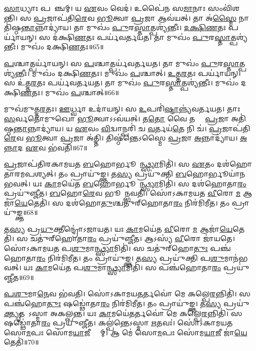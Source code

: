 \ul{𑌸𑌾}𑌧𑍍𑌯𑌾𑌃 𑌪𑌰𑌾᳚𑌞𑍍𑌚𑌮𑍍।
𑌯 \ul{𑌏}𑌵𑌂 𑌵𑍇𑌦॑।
𑌉𑌪𑍈॑𑌨 𑌸\ul{𑌮𑌾}𑌨𑌾𑌃 𑌸𑌂𑌵𑌿॑𑌶𑌨𑍍𑌤𑌿।
𑌸 \ul{𑌪𑍍𑌰}𑌜𑌾𑌪॑𑌤𑌿\ul{𑌰𑍇}𑌵 \ul{𑌭𑍂}𑌤𑍍𑌵𑌾 \ul{𑌪𑍍𑌰}𑌜𑌾 𑌆𑌵॑𑌯𑌤𑍍।
𑌤𑌾 𑌅॑\ul{𑌸𑍍𑌮𑍈} 𑌨𑌾𑌤𑌿॑𑌷𑍍𑌠\ul{𑌨𑍍𑌤𑌾}𑌨𑍍𑌨𑌾𑌦𑍍𑌯𑌾॑𑌯।
𑌤𑌾 𑌮𑍁𑌖𑌂॑ \ul{𑌪𑍁}𑌰\ul{𑌸𑍍𑌤𑌾}𑌤𑍍𑌪𑌶𑍍𑌯॑𑌨𑍍𑌤𑍀𑌃।
\ul{𑌦}\ul{𑌕𑍍𑌷𑌿}\ul{𑌣}𑌤𑌃 𑌪𑌰𑍍𑌯𑌾॑𑌯𑌨𑍍।
𑌸 𑌦॑𑌕𑍍𑌷𑌿\ul{𑌣}𑌤𑌃 𑌪𑌰𑍍𑌯॑𑌵𑌰𑍍𑌤𑌯𑌤।
𑌤𑌾 𑌮𑍁𑌖𑌂॑ \ul{𑌪𑍁}𑌰\ul{𑌸𑍍𑌤𑌾}𑌤𑍍𑌪𑌶𑍍𑌯॑𑌨𑍍𑌤𑍀𑌃।
𑌮𑍁𑌖𑌂॑ 𑌦𑌕𑍍𑌷𑌿\ul{𑌣}𑌤𑌃॥65॥

\ul{𑌪}𑌶𑍍𑌚𑌾𑌤𑍍𑌪𑌰𑍍𑌯𑌾॑𑌯𑌨𑍍।
𑌸 \ul{𑌪}𑌶𑍍𑌚𑌾𑌤𑍍𑌪𑌰𑍍𑌯॑𑌵𑌰𑍍𑌤𑌯𑌤।
𑌤𑌾 𑌮𑍁𑌖𑌂॑ \ul{𑌪𑍁}𑌰\ul{𑌸𑍍𑌤𑌾}𑌤𑍍𑌪𑌶𑍍𑌯॑𑌨𑍍𑌤𑍀𑌃।
𑌮𑍁𑌖𑌂॑ 𑌦𑌕𑍍𑌷𑌿\ul{𑌣}𑌤𑌃।
𑌮𑍁𑌖𑌂॑ \ul{𑌪}𑌶𑍍𑌚𑌾𑌤𑍍।
\ul{𑌉}\ul{𑌤𑍍𑌤}\ul{𑌰}𑌤𑌃 𑌪𑌰𑍍𑌯𑌾॑𑌯𑌨𑍍।
𑌸 𑌉॑𑌤𑍍𑌤\ul{𑌰}𑌤𑌃 𑌪𑌰𑍍𑌯॑𑌵𑌰𑍍𑌤𑌯𑌤।
𑌤𑌾 𑌮𑍁𑌖𑌂॑ \ul{𑌪𑍁}𑌰\ul{𑌸𑍍𑌤𑌾}𑌤𑍍𑌪𑌶𑍍𑌯॑𑌨𑍍𑌤𑍀𑌃।
𑌮𑍁𑌖𑌂॑ 𑌦𑌕𑍍𑌷𑌿\ul{𑌣}𑌤𑌃।
𑌮𑍁𑌖𑌂॑ \ul{𑌪}𑌶𑍍𑌚𑌾𑌤𑍍॥66॥

𑌮𑍁𑌖॑𑌮𑍁𑌤𑍍𑌤\ul{𑌰}𑌤𑌃।
\ul{𑌊}𑌰𑍍𑌧𑍍𑌵𑌾 𑌉𑌦𑌾॑𑌯𑌨𑍍।
𑌸 \ul{𑌉}𑌪𑌰𑌿॑\ul{𑌷𑍍𑌟𑌾}𑌨𑍍𑌨𑍍𑌯॑𑌵𑌰𑍍𑌤𑌯𑌤।
𑌤𑌾𑌃 \ul{𑌸}𑌰𑍍𑌵𑌤𑍋॑𑌮𑍁𑌖𑍋 \ul{𑌭𑍂}𑌤𑍍𑌵𑌾\-𑌽𑌽𑌵॑𑌯𑌤𑍍।
𑌤\ul{𑌤𑍋} 𑌵𑍈 𑌤𑌸𑍍𑌮𑍈᳚ \ul{𑌪𑍍𑌰}𑌜𑌾 𑌅𑌤𑌿॑𑌷𑍍𑌠\ul{𑌨𑍍𑌤𑌾}𑌨𑍍𑌨𑌾𑌦𑍍𑌯𑌾॑𑌯।
𑌯 \ul{𑌏}𑌵𑌂 \ul{𑌵𑌿}𑌦𑍍𑌵𑌾𑌨𑍍𑌪𑌰𑌿॑ 𑌚 \ul{𑌵}𑌰𑍍𑌤𑌯॑\ul{𑌤𑍇} 𑌨𑌿 𑌚॑।
\ul{𑌪𑍍𑌰}𑌜𑌾𑌪॑𑌤𑌿\ul{𑌰𑍇}𑌵 \ul{𑌭𑍂}𑌤𑍍𑌵𑌾 \ul{𑌪𑍍𑌰}𑌜𑌾 𑌅॑𑌤𑍍𑌤𑌿।
𑌤𑌿𑌷𑍍𑌠॑𑌨𑍍𑌤𑍇\-𑌽𑌸𑍍𑌮𑍈 \ul{𑌪𑍍𑌰}𑌜𑌾 \ul{𑌅}𑌨𑍍𑌨𑌾𑌦𑍍𑌯𑌾॑𑌯।
\ul{𑌅}\ul{𑌨𑍍𑌨𑌾}𑌦 \ul{𑌏}𑌵 𑌭॑𑌵𑌤𑌿॥67॥\anuvakamend[\ul{𑌆}\ul{𑌸𑍀}𑌦𑍍𑌵𑍇𑌦॑ 𑌚𑌨𑍍𑌦𑍍𑌰\ul{𑌮}𑌸𑍍𑌤𑍍𑌵𑌂 𑌯 \ul{𑌏}𑌵𑌂 𑌵𑍇𑌦𑍇᳚𑌨𑍍𑌦𑍍𑌰𑌿\ul{𑌯𑌾}𑌵𑍍𑌯𑍇॑𑌵 𑌭॑𑌵𑌤𑌿 \ul{𑌪𑍍𑌰}𑌤𑍍𑌯\ul{𑌞𑍍𑌚𑌂} 𑌮𑍁𑌖𑌂॑ 𑌦𑌕𑍍𑌷𑌿\ul{𑌣}𑌤𑍋 𑌮𑍁𑌖𑌂॑ \ul{𑌪}𑌶𑍍𑌚𑌾𑌨𑍍𑌨𑌵॑ 𑌚]

\ul{𑌪𑍍𑌰}𑌜𑌾𑌪॑𑌤𑌿𑌰𑌕𑌾𑌮𑌯𑌤 \ul{𑌬}𑌹𑍋𑌰𑍍𑌭𑍂𑌯𑌾᳚\ul{𑌨𑍍𑌥𑍍𑌸𑍍𑌯𑌾}𑌮𑌿𑌤𑌿॑।
𑌸 \ul{𑌏}𑌤𑌂 𑌦𑌶॑𑌹𑍋𑌤𑌾𑌰𑌮𑌪𑌶𑍍𑌯𑌤𑍍।
𑌤𑌂 𑌪𑍍𑌰𑌾𑌯𑍁॑𑌙𑍍𑌕𑍍𑌤।
𑌤\ul{𑌸𑍍𑌯} 𑌪𑍍𑌰𑌯𑍁॑𑌕𑍍𑌤𑌿 \ul{𑌬}𑌹𑍋𑌰𑍍𑌭𑍂𑌯𑌾॑𑌨𑌭𑌵𑌤𑍍।
𑌯𑌃 \ul{𑌕𑌾}𑌮𑌯𑍇॑𑌤 \ul{𑌬}𑌹𑍋𑌰𑍍𑌭𑍂𑌯𑌾᳚\ul{𑌨𑍍𑌥𑍍𑌸𑍍𑌯𑌾}𑌮𑌿𑌤𑌿॑।
𑌸 𑌦𑌶॑𑌹𑍋𑌤𑌾\ul{𑌰𑌂} 𑌪𑍍𑌰𑌯𑍁॑𑌞𑍍𑌜𑍀𑌤।
\ul{𑌬}𑌹𑍋\ul{𑌰𑍇}𑌵 𑌭𑍂𑌯𑌾᳚𑌨𑍍𑌭𑌵𑌤𑌿।
𑌸𑍋॑𑌽𑌕𑌾𑌮𑌯𑌤 \ul{𑌵𑍀}𑌰𑍋 \ul{𑌮} 𑌆𑌜𑌾॑\ul{𑌯𑍇}𑌤𑍇𑌤𑌿॑।
𑌸 𑌦𑌶॑𑌹𑍋\ul{𑌤𑍁}𑌶𑍍𑌚𑌤𑍁॑𑌰𑍍‌\mbox{}𑌹𑍋𑌤𑌾\ul{𑌰𑌂} 𑌨𑌿𑌰॑𑌮𑌿𑌮𑍀𑌤।
𑌤𑌂 𑌪𑍍𑌰𑌾𑌯𑍁॑𑌙𑍍𑌕𑍍𑌤॥68॥

𑌤\ul{𑌸𑍍𑌯} 𑌪𑍍𑌰\ul{𑌯𑍁}𑌕𑍍𑌤𑍀𑌨𑍍𑌦𑍍𑌰𑍋॑\-𑌽𑌜𑌾𑌯𑌤।
𑌯𑌃 \ul{𑌕𑌾}𑌮𑌯𑍇॑𑌤 \ul{𑌵𑍀}𑌰𑍋 \ul{𑌮} 𑌆𑌜𑌾॑\ul{𑌯𑍇}𑌤𑍇𑌤𑌿॑।
𑌸 𑌚𑌤𑍁॑𑌰𑍍‌\mbox{}𑌹𑍋𑌤𑌾\ul{𑌰𑌂} 𑌪𑍍𑌰𑌯𑍁॑𑌞𑍍𑌜𑍀𑌤।
𑌆𑌽𑌸𑍍𑌯॑ \ul{𑌵𑍀}𑌰𑍋 𑌜𑌾॑𑌯𑌤𑍇।
𑌸𑍋॑𑌽𑌕𑌾𑌮𑌯𑌤 𑌪\ul{𑌶𑍁}𑌮𑌾\ul{𑌨𑍍𑌥𑍍𑌸𑍍𑌯𑌾}𑌮𑌿𑌤𑌿॑।
𑌸 𑌚𑌤𑍁॑𑌰𑍍‌\mbox{}𑌹𑍋\ul{𑌤𑍁𑌃} 𑌪𑌞𑍍𑌚॑𑌹𑍋𑌤𑌾\ul{𑌰𑌂} 𑌨𑌿𑌰॑𑌮𑌿𑌮𑍀𑌤।
𑌤𑌂 𑌪𑍍𑌰𑌾𑌯𑍁॑𑌙𑍍𑌕𑍍𑌤।
𑌤\ul{𑌸𑍍𑌯} 𑌪𑍍𑌰𑌯𑍁॑𑌕𑍍𑌤𑌿 𑌪\ul{𑌶𑍁}𑌮𑌾𑌨॑𑌭𑌵𑌤𑍍।
𑌯𑌃 \ul{𑌕𑌾}𑌮𑌯𑍇॑𑌤 𑌪\ul{𑌶𑍁}𑌮𑌾\ul{𑌨𑍍𑌥𑍍𑌸𑍍𑌯𑌾}𑌮𑌿𑌤𑌿॑।
𑌸 𑌪𑌞𑍍𑌚॑𑌹𑍋𑌤𑌾\ul{𑌰𑌂} 𑌪𑍍𑌰𑌯𑍁॑𑌞𑍍𑌜𑍀𑌤॥69॥

\ul{𑌪}\ul{𑌶𑍁}𑌮𑌾\ul{𑌨𑍇}𑌵 𑌭॑𑌵𑌤𑌿।
𑌸𑍋॑𑌽𑌕𑌾𑌮𑌯\ul{𑌤}𑌰𑍍𑌤𑌵𑍋॑ 𑌮𑍇 𑌕𑌲𑍍𑌪𑍇\ul{𑌰}𑌨𑍍𑌨𑌿𑌤𑌿॑।
𑌸 𑌪𑌞𑍍𑌚॑𑌹𑍋\ul{𑌤𑍁𑌃} 𑌷𑌡𑍍𑌢𑍋॑𑌤𑌾\ul{𑌰𑌂} 𑌨𑌿𑌰॑𑌮𑌿𑌮𑍀𑌤।
𑌤𑌂 𑌪𑍍𑌰𑌾𑌯𑍁॑𑌙𑍍𑌕𑍍𑌤।
𑌤\ul{𑌸𑍍𑌯} 𑌪𑍍𑌰𑌯𑍁॑\ul{𑌕𑍍𑌤𑍍𑌯𑍃}𑌤𑌵𑍋᳚\-𑌽𑌸𑍍𑌮𑌾 𑌅𑌕𑌲𑍍𑌪𑌨𑍍𑌤।
𑌯𑌃 \ul{𑌕𑌾}𑌮𑌯𑍇॑\ul{𑌤}𑌰𑍍𑌤𑌵𑍋॑ 𑌮𑍇 𑌕𑌲𑍍𑌪𑍇\ul{𑌰}𑌨𑍍𑌨𑌿𑌤𑌿॑।
𑌸 𑌷𑌡𑍍𑌢𑍋॑𑌤𑌾\ul{𑌰𑌂} 𑌪𑍍𑌰𑌯𑍁॑𑌞𑍍𑌜𑍀𑌤।
𑌕𑌲𑍍𑌪॑𑌨𑍍𑌤𑍇\-𑌽𑌸𑍍𑌮𑌾 \ul{𑌋}𑌤𑌵𑌃॑।
𑌸𑍋॑𑌽𑌕𑌾𑌮𑌯𑌤 𑌸𑍋\ul{𑌮}𑌪𑌃 𑌸𑍋॑𑌮\ul{𑌯𑌾}𑌜𑍀 𑌸𑍍𑌯𑌾᳚𑌮𑍍।
𑌆 𑌮𑍇॑ 𑌸𑍋\ul{𑌮}𑌪𑌃 𑌸𑍋॑𑌮\ul{𑌯𑌾}𑌜𑍀 𑌜𑌾॑\ul{𑌯𑍇}𑌤𑍇𑌤𑌿॑॥70॥

